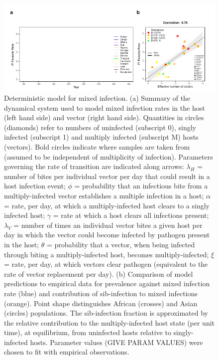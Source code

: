 \documentclass[9pt,lineno]{elife}
\begin{document}
\begin{figure}[ht]
  \centering{}
  \includegraphics[width=\textwidth]{Fig5.pdf}
  \caption{Deterministic model for mixed infection.  (a) Summary of the dynamical system used to model mixed infection rates in the host (left hand side) and vector (right hand side).  Quantities in circles (diamonds) refer to numbers of uninfected (subscript 0), singly infected (subscript 1) and multiply infected (subscript M) hosts (vectors).  Bold circles indicate where samples are taken from (assumed to be independent of multiplicity of infection).  Parameters governing the rate of transition are indicated along arrows: $\lambda_H$ = number of bites per individual vector per day that could result in a host infection event; $\phi$ = probability that an infectious bite from a multiply-infected vector establishes a multiple infection in a host; $\alpha$ = rate, per day, at which a multiply-infected host clears to a singly infected host; $\gamma$ = rate at which a host clears all infections present; $\lambda_V$ = number of times an individual vector bites a given host per day in which the vector could become infected by pathogen present in the host; $\theta$ = probability that a vector, when being infected through biting a multiply-infected host, becomes multiply-infected; $\xi$ = rate, per day, at which vectors clear pathogen (equivalent to the rate of vector replacement per day).  (b) Comparison of model predictions to empirical data for prevalence against mixed infection rate (blue) and contribution of sib-infection to mixed infections (orange).  Point shape distinguishes African (crosses) and Asian (circles) populations.  The sib-infection fraction is approximated by the relative contribution to the multiply-infected host state (per unit time), at equilibrium, from uninfected hosts relative to singly-infected hosts.  Parameter values (GIVE PARAM VALUES) were chosen to fit with empirical observations.}
  \label{fig:model}
\end{figure}
\end{document}
